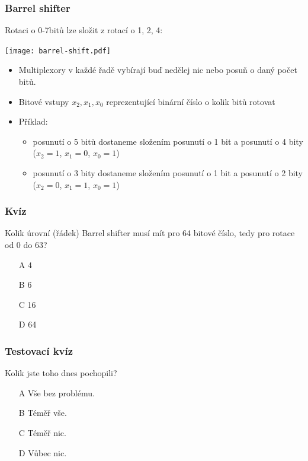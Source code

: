 \documentclass{beamer}
\begin{document}
\begin{frame}
\frametitle{Barrel shifter}

Rotaci o 0-7bitů lze složit z rotací o 1, 2, 4:
\begin{center}
   \texttt{[image: barrel-shift.pdf]}
\end{center}

\begin{itemize}
\item Multiplexory v každé řadě vybírají buď nedělej nic nebo posuň o daný počet bitů.
\item Bitové vstupy $x_2,x_1,x_0$ reprezentující binární číslo o kolik bitů rotovat
\item Příklad:
\begin{itemize}
\item posunutí o 5 bitů dostaneme složením posunutí o 1 bit a posunutí o 4 bity ($x_2=1$, $x_1=0$, $x_0=1$)
\item posunutí o 3 bity dostaneme složením posunutí o 1 bit a posunutí o 2 bity ($x_2=0$, $x_1=1$, $x_0=1$)
\end{itemize}
\end{itemize}

\end{frame}


\begin{frame}
\frametitle{Kvíz}

Kolik úrovní (řádek) Barrel shifter musí mít pro 64 bitové číslo, tedy pro rotace od 0 do 63?
\begin{itemize}
\item[A] 4
\item[B] 6
\item[C] 16
\item[D] 64
\end{itemize}

\end{frame}


\begin{frame}
\frametitle{Testovací kvíz}

Kolik jste toho dnes pochopili?
\begin{itemize}
\item[A] Vše bez problému.
\item[B] Téměř vše.
\item[C] Téměř nic.
\item[D] Vůbec nic.
\end{itemize}

\end{frame}
\end{document}
